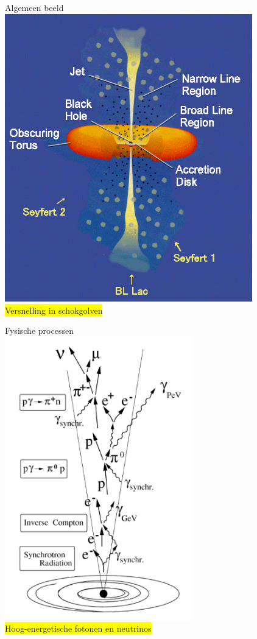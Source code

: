 \Tr
\begin{center}
{\blue Algemeen beeld}\\[2mm]
\includegraphics[keepaspectratio,height=12.5cm]{agn-1}\\[5mm]
\colorbox{yellow}{Versnelling in schokgolven}
\end{center}

\newpage

\begin{center}
{\blue Fysische processen}\\[5mm]
\includegraphics[keepaspectratio,height=12.3cm]{jet}\\[5mm]
\colorbox{yellow}{Hoog-energetische fotonen en neutrinos}
\end{center}
